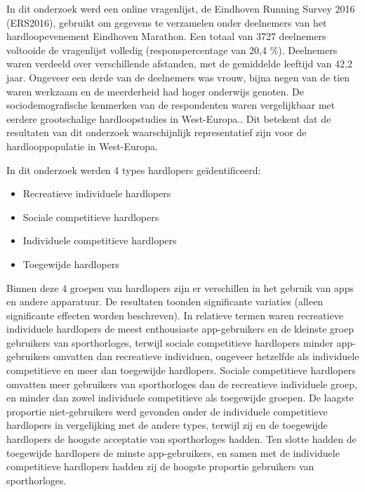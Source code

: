     In dit onderzoek werd een online vragenlijst, de Eindhoven Running Survey 2016 (ERS2016), 
    gebruikt om gegevens te verzamelen onder deelnemers van het hardloopevenement Eindhoven Marathon. 
    Een totaal van 3727 deelnemers voltooide de vragenlijst volledig (responspercentage van 20,4 \%). 
    Deelnemers waren verdeeld over verschillende afstanden, met de gemiddelde leeftijd van 42,2 jaar. 
    Ongeveer een derde van de deelnemers was vrouw, bijna negen van de tien waren werkzaam en de meerderheid had hoger onderwijs genoten. 
    De sociodemografische kenmerken van de respondenten waren vergelijkbaar met eerdere grootschalige hardloopstudies in West-Europa.\textcite{Janssen2020}.
    Dit betekent dat de resultaten van dit onderzoek waarschijnlijk representatief zijn voor de hardlooppopulatie in West-Europa.


    In dit onderzoek werden 4 types hardlopers geïdentificeerd:
    \begin{itemize}
        \item Recreatieve individuele hardlopers
        \item Sociale competitieve hardlopers
        \item Individuele competitieve hardlopers
        \item Toegewijde hardlopers
    \end{itemize}


    Binnen deze 4 groepen van hardlopers zijn er verschillen in het gebruik van apps en andere apparatuur. 
    De resultaten toonden significante variaties (alleen significante effecten worden beschreven). 
    In relatieve termen waren recreatieve individuele hardlopers de meest enthousiaste app-gebruikers
    en de kleinste groep gebruikers van sporthorloges, terwijl sociale competitieve hardlopers minder app-gebruikers 
    omvatten dan recreatieve individuen, ongeveer hetzelfde als individuele competitieve
    en meer dan toegewijde hardlopers. Sociale competitieve hardlopers omvatten meer gebruikers van sporthorloges 
    dan de recreatieve individuele groep, en minder dan zowel individuele competitieve
    als toegewijde groepen. De laagste proportie niet-gebruikers werd gevonden 
    onder de individuele competitieve hardlopers in vergelijking met de andere types, 
    terwijl zij en de toegewijde hardlopers de hoogste acceptatie van sporthorloges hadden. 
    Ten slotte hadden de toegewijde hardlopers de minste app-gebruikers, 
    en samen met de individuele competitieve hardlopers hadden zij de hoogste proportie gebruikers van sporthorloges.


